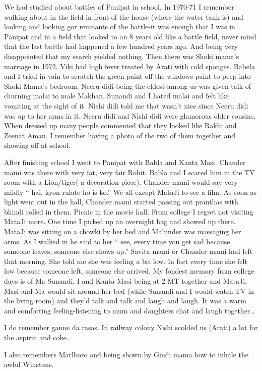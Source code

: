 We had studied about battles of Panipat in school. In 1970-71 I remember walking about in the field in front of the house (where the water tank is) and looking and looking gor remnants of the battle-it was enough that I was in Panipat and in a field that looked to an 8 years old like a battle field, never mind that the last battle had happened a few hundred years ago. And being very disappointed that my search yielded nothing. 
Then there was Shoki mama’s marriage in 1972. Viki had high fever treated by Arati with cold sponges. 
Babela and I tried in vain to scratch the green paint off the windows paint to peep into Shoki Mama’s bedroom. 
Neeru didi-being the eldest among us was given talk of churning malai to male Makhan. Sunandi and I hated malai and felt like vomiting at the sight of it. Nishi didi told me that wasn’t nice since Neeru didi was up to her arms in it. 
Neeru didi and Nishi didi were glamorous older cousins. When dressed up many people commented that they looked like Rakhi and Zeenat Aman. I remember having a photo of the two of them together and showing off at school. 

After finishing school I went to Panipat with Babla and Kanta Masi. Chander mami was there with very fat, very fair Rohit. Babla and I scared him in the TV room with a Lion/tiger( a decoration piece). Chander mami would say-very mildly “ hai, kyon rulate ho is ko.” 
We all except MataJi to see a film. As soon as light went out in the hall, Chander mami started passing out pranthas with bhindi rolled in them. Picnic in the movie hall. 
From college I regret not visiting MataJi more. One time I picked up an overnight bag and showed up there. MataJi was sitting on a chowki by her bed and Mahinder was massaging her arms. As I walked in he said to her “ see, every time you get sad because someone leaves, someone else shows up.” Savita mami or Chander mami had left that morning. She told me she was feeling a bit low. In fact every time she felt low because someone left, someone else arrived. 
My fondest memory from college days is of Ma Sunandi, I and Kanta Masi being at 2 MT together and MataJi, Masi and Ma would sit around her bed (while Sunandi and I would watch TV in the living room) and they’d talk and talk and laugh and laugh. It was a warm and comforting feeling-listening to mum and daughters chat and laugh together…

I do remember ganne da rasas. In railway colony Nishi scolded us (Arati) a lot for the aspirin and coke. 

I also remembers Marlboro and being shown by Gindi mama how to inhale the awful Winstons. 


